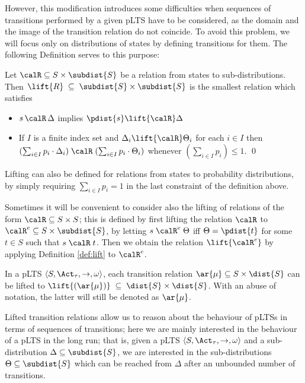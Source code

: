 \documentclass{LMCS}
\begin{document}
However, this modification introduces some difficulties when sequences of transitions performed by a 
given pLTS have to be considered, as the domain and the image of the transition relation do not 
coincide. To avoid this problem, we will focus only on distributions of states by defining 
transitions for them. The following Definition serves to this purpose:
\begin{defi}
\label{def:lift}
Let $\calR \subseteq S \times \subdist{S}$ be a relation from states to 
 sub-distributions. Then
$\lift{R} \;\subseteq\; \subdist{S} \times \subdist{S}$ is the smallest relation which satisfies 
\begin{itemize}
\item $s \,\calR\, \Delta$ implies $\pdist{s} \lift{\calR} \Delta$

\item If $I$ is a finite index set and $\Delta_i \lift{\calR} \Theta_i$ for each $i \in I$ then
      $(\sum_{i \in I} p_i \cdot \Delta_i ) \;\calR\; (\sum_{i \in I} p_i \cdot \Theta_i )$ whenever 
       $\left(\sum_{i \in I} p_i\right) \leq 1$.  \qed
\end{itemize}
\end{defi}
\noindent 
Lifting can also be defined for relations from states to probability distributions, 
by simply requiring $\sum_{i \in I} p_i = 1$ in the last constraint of the definition above.

Sometimes it will be convenient to consider also the lifting 
of relations of the form $\calR \subseteq S \times S$; 
this is defined by first lifting the relation 
$\calR$ to $\calR^e \subseteq S \times \subdist{S}$, 
by letting $s \;\calR^e\; \Theta$ iff $\Theta = \pdist{t}$ for some $t \in S$ such that 
$s\;\calR\;t$. Then we obtain the relation $\lift{\calR^e}$ by 
applying Definition \ref{def:lift} to $\calR^e$.

In a pLTS $\langle S, \Act_\tau, \rightarrow, \omega \rangle$, each transition relation 
$\ar{\mu} \subseteq S \times \dist{S}$ can be lifted to
$\lift{(\ar{\mu})} \;\subseteq\; \dist{S} \times \dist{S}$. 
With an abuse of notation, the latter will still be denoted as $\ar{\mu}$.

Lifted transition relations allow us to reason about the behaviour of pLTSs in terms of 
sequences of transitions; here we are mainly interested in the behaviour of a pLTS in 
the long run; that is, given a pLTS $\langle S, \Act_\tau, \rightarrow, \omega \rangle$ 
and a sub-distribution $\Delta \subseteq \subdist{S}$, we are interested in the sub-distributions 
$\Theta \subseteq \subdist{S}$ which can be reached from $\Delta$ after an unbounded 
number of transitions. 
\end{document}
